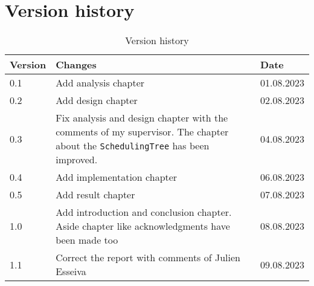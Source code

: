 \chapter{Version history}
\label{chap:report-versions}

\begin{table}[ht]
   \centering
   \begin{tabular}{|m{}|m{}|m{}|}
      \hline
      \textbf{Version} & \textbf{Changes} & \textbf{Date} \\ [0.5ex]
      \hline
      0.1 & Add analysis chapter & 01.08.2023  \\
      \hline
      0.2 & Add design chapter & 02.08.2023  \\
      \hline
      0.3 & Fix analysis and design chapter with the comments of my supervisor.
      The chapter about the \texttt{SchedulingTree} has been improved.
      & 04.08.2023  \\
      \hline
      0.4 & Add implementation chapter & 06.08.2023  \\
      \hline
      0.5 & Add result chapter & 07.08.2023  \\
      \hline
      1.0 & Add introduction and conclusion chapter. Aside chapter like
      acknowledgments have been made too & 08.08.2023  \\
      \hline
      1.1 & Correct the report with comments of Julien Esseiva & 09.08.2023  \\
      \hline
   \end{tabular}
   \caption{Version history}
   \label{tab:version-history}
\end{table}